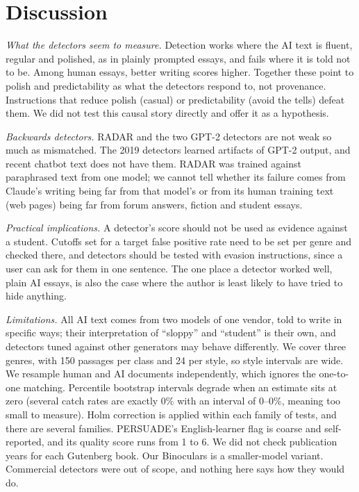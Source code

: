 \documentclass[conference]{IEEEtran}
\begin{document}
\section{Discussion}
\textit{What the detectors seem to measure.} Detection works where the AI text is fluent, regular and polished, as in plainly prompted essays, and fails where it is told not to be. Among human essays, better writing scores higher. Together these point to polish and predictability as what the detectors respond to, not provenance. Instructions that reduce polish (casual) or predictability (avoid the tells) defeat them. We did not test this causal story directly and offer it as a hypothesis.

\textit{Backwards detectors.} RADAR and the two GPT-2 detectors are not weak so much as mismatched. The 2019 detectors learned artifacts of GPT-2 output, and recent chatbot text does not have them. RADAR was trained against paraphrased text from one model; we cannot tell whether its failure comes from Claude's writing being far from that model's or from its human training text (web pages) being far from forum answers, fiction and student essays.

\textit{Practical implications.} A detector's score should not be used as evidence against a student. Cutoffs set for a target false positive rate need to be set per genre and checked there, and detectors should be tested with evasion instructions, since a user can ask for them in one sentence. The one place a detector worked well, plain AI essays, is also the case where the author is least likely to have tried to hide anything.

\textit{Limitations.} All AI text comes from two models of one vendor, told to write in specific ways; their interpretation of ``sloppy'' and ``student'' is their own, and detectors tuned against other generators may behave differently. We cover three genres, with 150 passages per class and 24 per style, so style intervals are wide. We resample human and AI documents independently, which ignores the one-to-one matching. Percentile bootstrap intervals degrade when an estimate sits at zero (several catch rates are exactly 0\% with an interval of 0--0\%, meaning too small to measure). Holm correction is applied within each family of tests, and there are several families. PERSUADE's English-learner flag is coarse and self-reported, and its quality score runs from 1 to 6. We did not check publication years for each Gutenberg book. Our Binoculars is a smaller-model variant. Commercial detectors were out of scope, and nothing here says how they would do.
\end{document}
